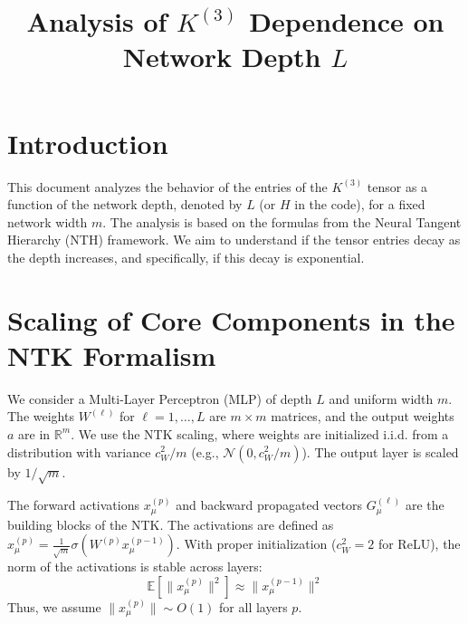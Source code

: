 \documentclass[11pt,a4paper]{article}
\title{\textbf{Analysis of $K^{(3)}$ Dependence on Network Depth $L$}}
\author{}
\date{}
\begin{document}
\maketitle


\section{Introduction}

This document analyzes the behavior of the entries of the $K^{(3)}$ tensor as a function of the network depth, denoted by $L$ (or $H$ in the code), for a fixed network width $m$. The analysis is based on the formulas from the Neural Tangent Hierarchy (NTH) framework. We aim to understand if the tensor entries decay as the depth increases, and specifically, if this decay is exponential.

\section{Scaling of Core Components in the NTK Formalism}

We consider a Multi-Layer Perceptron (MLP) of depth $L$ and uniform width $m$. The weights $W^{(\ell)}$ for $\ell=1, \dots, L$ are $m \times m$ matrices, and the output weights $a$ are in $\mathbb{R}^m$. We use the NTK scaling, where weights are initialized i.i.d. from a distribution with variance $c_W^2/m$ (e.g., $\mathcal{N}(0, c_W^2/m)$). The output layer is scaled by $1/\sqrt{m}$.

The forward activations $x^{(p)}_\mu$ and backward propagated vectors $G^{(\ell)}_\mu$ are the building blocks of the NTK.
The activations are defined as $x^{(p)}_\mu = \frac{1}{\sqrt{m}}\sigma(W^{(p)} x^{(p-1)}_\mu)$. With proper initialization ($c_W^2=2$ for ReLU), the norm of the activations is stable across layers:
\begin{equation}
    \mathbb{E}[\|x^{(p)}_\mu\|^2] \approx \|x^{(p-1)}_\mu\|^2
\end{equation}
Thus, we assume $\|x^{(p)}_\mu\| \sim O(1)$ for all layers $p$.
\end{document}
